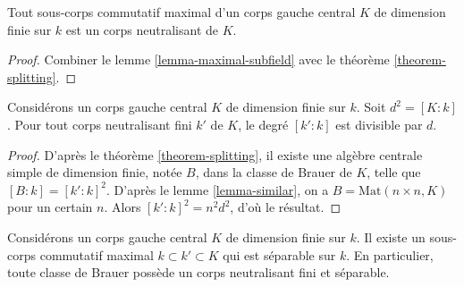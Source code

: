 \begin{lemma}
\label{lemma-maximal-subfield-splits}
Tout sous-corps commutatif maximal d'un corps gauche central $K$ de dimension finie sur $k$ est
un corps neutralisant de $K$.
\end{lemma}

\begin{proof}
Combiner le lemme \ref{lemma-maximal-subfield} avec le
théorème \ref{theorem-splitting}.
\end{proof}

\begin{lemma}
\label{lemma-splitting-field-degree}
Considérons un corps gauche central $K$ de dimension finie sur $k$. Soit $d^2 = [K : k]$.
Pour tout corps neutralisant fini $k'$ de $K$, le degré $[k' : k]$ est
divisible par $d$.
\end{lemma}

\begin{proof}
D'après le théorème \ref{theorem-splitting}, il existe une algèbre centrale
simple de dimension finie, notée $B$, dans la classe de Brauer de $K$, telle que
$[B : k] = [k' : k]^2$. D'après le
lemme \ref{lemma-similar},
on a $B = \text{Mat}(n \times n, K)$ pour un certain $n$.
Alors $[k' : k]^2 = n^2d^2$, d'où le résultat.
\end{proof}

\begin{proposition}
\label{proposition-separable-splitting-field}
Considérons un corps gauche central $K$ de dimension finie sur $k$.
Il existe un sous-corps commutatif maximal $k \subset k' \subset K$ qui
est séparable sur $k$.
En particulier, toute classe de Brauer possède un corps neutralisant
fini et séparable.
\end{proposition}

